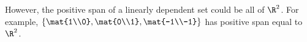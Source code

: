 \begin{enumerate}
\begin{enumerate}
					However, the positive span of a linearly dependent set could be all of $\R^2$. For example, $\left\{
						\mat{1\\0},\mat{0\\1},\mat{-1\\-1}\right\}$ has positive span equal to $\R^2$.
			\end{enumerate}
		\end{enumerate} 